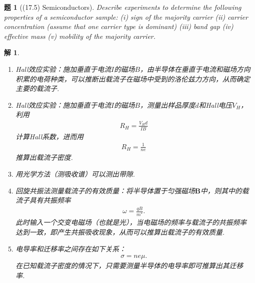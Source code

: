 \documentclass[UTF8,10pt,a4paper]{article}
\theoremstyle{Problem}
\newtheorem{prob}{题}
\theoremstyle{Solution}
\newtheorem*{sol}{解}
\begin{document}
\begin{prob}[(17.5) Semiconductors]
    Describe experiments to determine the following properties of a semiconductor sample: (i) sign of the majority carrier (ii) carrier concentration (assume that one carrier type is dominant) (iii) band gap (iv) effective mass (v) mobility of the majority carrier.
\end{prob}
\begin{sol}
    \begin{enumerate}
        \item[(i)] Hall效应实验：施加垂直于电流$I$的磁场$B$，由半导体在垂直于电流和磁场方向积累的电荷种类，可以推断出载流子在磁场中受到的洛伦兹力方向，从而确定主要的载流子.
        \item[(ii)] Hall效应实验：施加垂直于电流$I$的磁场$B$，测量出样品厚度$d$和Hall电压$V_H$，利用
        \begin{align}
            R_H=\frac{V_Hd}{IB}
        \end{align}
        计算Hall系数，进而用
        \begin{align}
            R_H=\frac{1}{ne}
        \end{align}
        推算出载流子密度.
        \item[(iii)] 用光学方法（测吸收谱）可以测出带隙.
        \item[(iv)] 回旋共振法测量载流子的有效质量：将半导体置于匀强磁场$\bm{B}$中，则其中的载流子具有共振频率
        \begin{align}
            \omega=\frac{qB}{m^*}.
        \end{align}
        此时输入一个交变电磁场（也就是光），当电磁场的频率与载流子的共振频率达到一致，即产生共振吸收现象，从而可以推算出载流子的有效质量.
        \item[(v)] 电导率和迁移率之间存在如下关系：
        \begin{align}
            \sigma=ne\mu.
        \end{align}
        在已知载流子密度的情况下，只需要测量半导体的电导率即可推算出其迁移率.
    \end{enumerate}
\end{sol}
\end{document}
